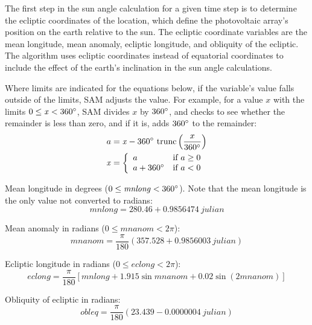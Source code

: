 \documentclass[12pt,letterpaper]{article}
\begin{document}
The first step in the sun angle calculation for a given time step is to determine the ecliptic coordinates of the location, which define the photovoltaic array's position on the earth relative to the sun. The ecliptic coordinate variables are the mean longitude, mean anomaly, ecliptic longitude, and obliquity of the ecliptic. The algorithm uses ecliptic coordinates instead of equatorial coordinates to include the effect of the earth's inclination in the sun angle calculations.

Where limits are indicated for the equations below, if the variable's value falls outside of the limits, SAM adjusts the value. For example, for a value $x$ with the limits $0\leq\mathit{x}<360\degree$, SAM divides $x$ by $360\degree$, and checks to see whether the remainder is less than zero, and if it is, adds $360\degree$ to the remainder:
\begin{align}\label{eqn-eclipticlimits}
a &= \mathit{x} - 360\degree~\text{trunc} \left(\frac{x}{360\degree}\right)\notag\\
\mathit{x}&= \left\{
  \begin{array}{ll}
    a & \text{if $a\geq0$}\\
    a+360\degree & \text{if $a<0$}
  \end{array}
\right.
\end{align}

Mean longitude in degrees ($0\leq\mathit{mnlong}<360\degree$). Note that the mean longitude is the only value not converted to radians:
\begin{equation}\label{eqn-mnlong}
\mathit{mnlong} = 280.46 + 0.9856474~\mathit{julian}
\end{equation}

Mean anomaly in radians ($0\leq\mathit{mnanom}<2\pi$):
\begin{equation}\label{eqn-mnanom}
\mathit{mnanom} = \frac{\pi}{180}\left(357.528 + 0.9856003~\mathit{julian}\right)
\end{equation}

Ecliptic longitude in radians ($0\leq\mathit{eclong}<2\pi$):
\begin{equation}\label{eqn-eclong}
\mathit{eclong} = \frac{\pi}{180}\left[\mathit{mnlong} + 1.915\sin \mathit{mnanom} + 0.02\sin(2\mathit{mnanom})\right]
\end{equation}

Obliquity of ecliptic in radians:
\begin{equation}\label{eqn-oblqec}
\mathit{obleq} = \frac{\pi}{180}\left(23.439 - 0.0000004~\mathit{julian}\right)
\end{equation}
\end{document}
